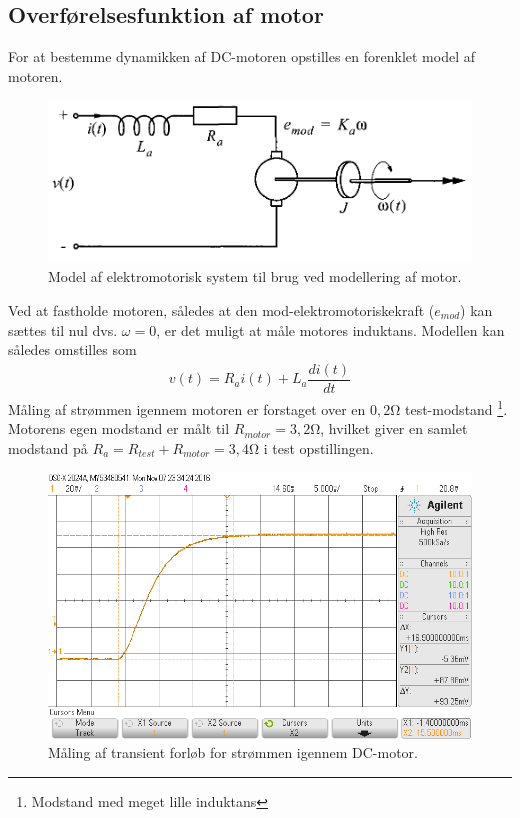 \subsection{Overførelsesfunktion af motor}
For at bestemme dynamikken af DC-motoren opstilles en forenklet model af motoren.

\begin{figure}[h!]
	\centering
	\includegraphics[width=.6\textwidth]{billeder/motor_model.png}
	\caption[sss]{Model af elektromotorisk system til brug ved modellering af motor\protect\footnotemark.}
	\label{fig:motor_model}
\end{figure}
\FloatBlock
{}

Ved at fastholde motoren, således at den mod-elektromotoriskekraft ($e_{mod}$) kan sættes til nul dvs. $\omega = 0$, er det muligt at måle motores induktans.
Modellen kan således omstilles som
\begin{align}
	v(t) = R_ai(t) + L_a\dfrac{di(t)}{dt}
\end{align}
Måling af strømmen igennem motoren er forstaget over en $0,2 \si{\ohm}$ test-modstand
\footnote{Modstand med meget lille induktans}.
Motorens egen modstand er målt til $R_{motor} = 3,2 \si{\ohm}$, hvilket giver en samlet modstand på $R_a = R_{test} + R_{motor} = 3,4 \si{\ohm}$ i test opstillingen. 

\begin{figure}[h!]
	\centering
	\includegraphics[width=.8\textwidth]{billeder/motor_L.png}
	\caption{Måling af transient forløb for strømmen igennem DC-motor.}
	\label{fig:motor_dynamik_scoop}
\end{figure}


